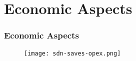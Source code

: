 \section{Economic Aspects}

\begin{frame}
\frametitle{Economic Aspects}

\begin{center}
  \begin{figure}
    \texttt{[image: sdn-saves-opex.png]}
  \end{figure}
\end{center}

\end{frame}
